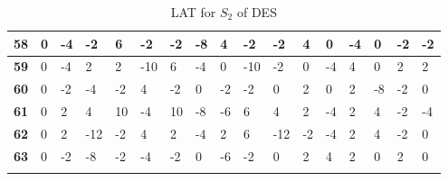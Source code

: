 \begin{longtable}[c]{|l|l|l|l|l|l|l|l|l|l|l|l|l|l|l|l|l|}
\textbf{58} & 0          & -4         & -2         & 6          & -2         & -2         & -8         & 4          & -2         & -2         & 4           & 0            & -4          & 0           & -2          & -2           \\ \hline
\textbf{59} & 0          & -4         & 2          & 2          & -10        & 6          & -4         & 0          & -10        & -2         & 0           & -4           & 4           & 0           & 2           & 2            \\ \hline
\textbf{60} & 0          & -2         & -4         & -2         & 4          & -2         & 0          & -2         & -2         & 0          & 2           & 0            & 2           & -8          & -2          & 0            \\ \hline
\textbf{61} & 0          & 2          & 4          & 10         & -4         & 10         & -8         & -6         & 6          & 4          & 2           & -4           & 2           & 4           & -2          & -4           \\ \hline
\textbf{62} & 0          & 2          & -12        & -2         & 4          & 2          & -4         & 2          & 6          & -12        & -2          & -4           & 2           & 4           & -2          & 0            \\ \hline
\textbf{63} & 0          & -2         & -8         & -2         & -4         & -2         & 0          & -6         & -2         & 0          & 2           & 4            & 2           & 0           & 2           & 0            \\ \hline
\caption{LAT for $S_2$ of DES}
\label{tbl:lat2}
\end{longtable}